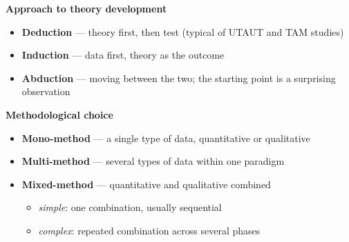 \documentclass[11pt,a4paper,british,twoside=false,headings=small,chapterprefix=false,numbers=noenddot]{scrbook}
\newcommand{\onionloc}[7]{}
\begin{document}
\begin{center}\small
\begin{minipage}{0.85\textwidth}
  {\color{uiared}\bfseries Approach to theory development}
  \begin{itemize}\footnotesize\setlength{\itemsep}{0.25em}
    \item \textbf{Deduction} --- theory first, then test (typical of UTAUT and TAM studies)
    \item \textbf{Induction} --- data first, theory as the outcome
    \item \textbf{Abduction} --- moving between the two; the starting point is a surprising observation
  \end{itemize}
  
  {\color{uiared}\bfseries Methodological choice}
  \begin{itemize}\footnotesize\setlength{\itemsep}{0.25em}
    \item \textbf{Mono-method} --- a single type of data, quantitative or qualitative
    \item \textbf{Multi-method} --- several types of data within one paradigm
    \item \textbf{Mixed-method} --- quantitative and qualitative combined
      \begin{itemize}\scriptsize
        \item \emph{simple}: one combination, usually sequential
        \item \emph{complex}: repeated combination across several phases
      \end{itemize}
  \end{itemize}
  \end{minipage}
  \onionloc{0}{1}{1}{0}{0}{0}{Layers 2--3}
\end{center}
\end{document}
